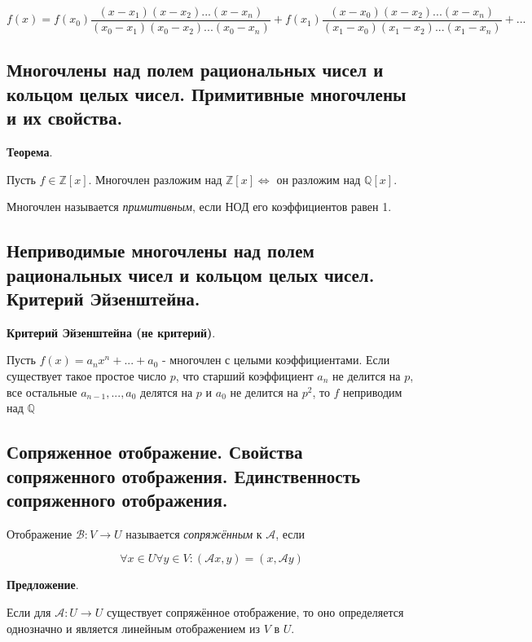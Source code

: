\documentclass[a4paper]{article}
\begin{document}
\[
f(x) = f(x_0) \frac{(x-x_1)(x-x_2)...(x-x_n)}{(x_0-x_1)(x_0-x_2)...(x_0-x_n)} + f(x_1) \frac{(x-x_0)(x-x_2)...(x-x_n)}{(x_1-x_0)(x_1-x_2)...(x_1-x_n)} + ...
\]

\subsection*{Многочлены над полем рациональных чисел и кольцом целых чисел. Примитивные многочлены и их свойства.}

\begin{htheorem}\textbf{Теорема}.

Пусть $f \in \mathbb{Z}[x]$. Многочлен разложим над $\mathbb{Z}[x] \Leftrightarrow$ он разложим над $\mathbb{Q}[x]$.
\end{htheorem}


Многочлен называется \textit{примитивным}, если НОД его коэффициентов равен 1.

\subsection*{Неприводимые многочлены над полем рациональных чисел и кольцом целых чисел. Критерий Эйзенштейна.}

\begin{htheorem}\textbf{Критерий Эйзенштейна (не критерий)}.

Пусть $f(x) = a_nx^n + ... + a_0$ - многочлен с целыми коэффициентами. Если существует такое простое число $p$, что старший коэффициент $a_n$ не делится на $p$, все остальные $a_{n-1}, ... , a_0$ делятся на $p$ и $a_0$ не делится на $p^2$, то $f$ неприводим над $\mathbb{Q}$
\end{htheorem}

\subsection*{Сопряженное отображение. Свойства сопряженного отображения. Единственность сопряженного отображения. }

Отображение $\mathcal{B}: V \rightarrow U$ называется \textit{сопряжённым} к $\mathcal{A}$, если

\[ \forall x \in U \forall y \in V: (\mathcal{A}x, y) = (x, \mathcal{A} y)\]

\begin{htheorem}\textbf{Предложение}.

Если для $\mathcal{A}: U \rightarrow U$ существует сопряжённое отображение, то оно определяется однозначно и является линейным отображением из $V$ в $U$.

\end{htheorem}
\end{document}
